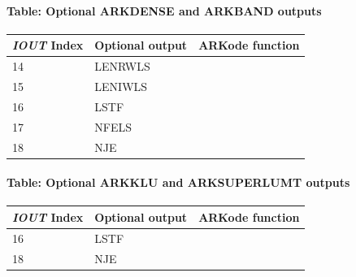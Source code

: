 \documentclass[letterpaper,10pt,english]{sphinxmanual}
\begin{document}
\paragraph{Table: Optional ARKDENSE and ARKBAND outputs}
\label{f_interface/Optional_output:table-optional-arkdense-and-arkband-outputs}\label{f_interface/Optional_output:finterface-dlsiouttable}
\begin{tabulary}{\linewidth}{|L|L|L|}
\hline
\textbf{
\emph{IOUT} Index
} & \textbf{
Optional output
} & \textbf{
ARKode function
}\\\hline

14
 & 
LENRWLS
 & 
{\hyperref[c_interface/User_callable:ARKDlsGetWorkSpace]{}}
\\\hline

15
 & 
LENIWLS
 & 
{\hyperref[c_interface/User_callable:ARKDlsGetWorkSpace]{}}
\\\hline

16
 & 
LSTF
 & 
{\hyperref[c_interface/User_callable:ARKDlsGetLastFlag]{}}
\\\hline

17
 & 
NFELS
 & 
{\hyperref[c_interface/User_callable:ARKDlsGetNumRhsEvals]{}}
\\\hline

18
 & 
NJE
 & 
{\hyperref[c_interface/User_callable:ARKDlsGetNumJacEvals]{}}
\\\hline
\end{tabulary}



\paragraph{Table: Optional ARKKLU and ARKSUPERLUMT outputs}
\label{f_interface/Optional_output:finterface-slsiouttable}\label{f_interface/Optional_output:table-optional-arkklu-and-arksuperlumt-outputs}
\begin{tabulary}{\linewidth}{|L|L|L|}
\hline
\textbf{
\emph{IOUT} Index
} & \textbf{
Optional output
} & \textbf{
ARKode function
}\\\hline

16
 & 
LSTF
 & 
{\hyperref[c_interface/User_callable:ARKSlsGetLastFlag]{}}
\\\hline

18
 & 
NJE
 & 
{\hyperref[c_interface/User_callable:ARKSlsGetNumJacEvals]{}}
\\\hline
\end{tabulary}
\end{document}
